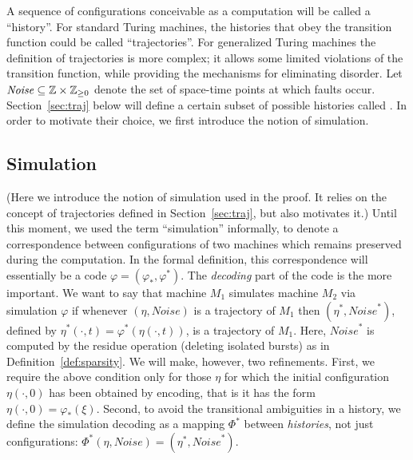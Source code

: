 \documentclass[11pt]{memoir}
\theoremstyle{definition} %
\renewcommand{\ge}{\geq}
\newcommand{\Noise}{\mathit{Noise}}
\begin{document}
A sequence of configurations conceivable as a computation will be called a ``history''.
For standard Turing machines, 
the histories that obey the transition function could be called ``trajectories''.
For generalized Turing machines the definition of trajectories is more complex; it
allows some limited violations of the transition function, while providing the mechanisms
for eliminating disorder.
Let \(    \Noise\subseteq \bbZ\times\bbZ_{\ge 0} \)
denote the set of space-time points at which faults occur.
Section~\ref{sec:traj} below will define a certain subset of possible histories
called .
In order to motivate their choice, we first introduce the notion of simulation.

 \subsection{Simulation}\label{sec:sim}

 (Here we introduce the notion of simulation used in the proof.
 It relies on the concept of trajectories defined in Section~\ref{sec:traj},
 but also motivates it.)
Until this moment, we used the term ``simulation'' informally, to denote
a correspondence between configurations of
two machines which remains preserved during the computation.
In the formal definition, this correspondence will essentially be a code
\( \varphi=(\varphi_{*},\varphi^{*}) \).
The \emph{decoding} part of the code is the more important.
We want to say that machine \( M_{1} \) simulates machine \( M_{2} \) via
simulation \( \varphi \) if whenever \( (\eta, \Noise) \) is a trajectory of \( M_{1} \) 
then \( (\eta^{*},\Noise^{*}) \),
defined by \( \eta^{*}(\cdot,t)=\varphi^{*}(\eta(\cdot,t)) \), is a
trajectory of \( M_{1} \).
Here, \( \Noise^{*} \) is computed by the residue operation (deleting isolated bursts)
as in Definition~\ref{def:sparsity}.
We will make, however, two refinements.
First, we require the above condition only for
those \( \eta \) for which the initial configuration
 \( \eta(\cdot,0) \) has been obtained by encoding, that is it has the form 
\( \eta(\cdot,0)=\varphi_{*}(\xi) \).
Second, to avoid the transitional ambiguities in a history,
we define the simulation decoding as a mapping \( \Phi^{*} \)
between \emph{histories}, not just configurations:
\( \Phi^{*}(\eta,\Noise)=(\eta^{*},\Noise^{*}) \).
\end{document}
